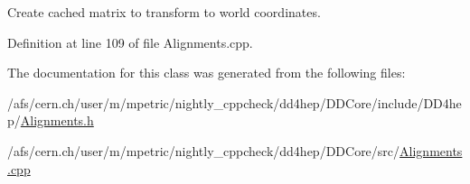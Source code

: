 Create cached matrix to transform to world coordinates. 



Definition at line 109 of file Alignments.\+cpp.



The documentation for this class was generated from the following files\+:\begin{DoxyCompactItemize}
\item 
/afs/cern.\+ch/user/m/mpetric/nightly\+\_\+cppcheck/dd4hep/\+D\+D\+Core/include/\+D\+D4hep/\hyperlink{_alignments_8h}{Alignments.\+h}\item 
/afs/cern.\+ch/user/m/mpetric/nightly\+\_\+cppcheck/dd4hep/\+D\+D\+Core/src/\hyperlink{_alignments_8cpp}{Alignments.\+cpp}\end{DoxyCompactItemize}
